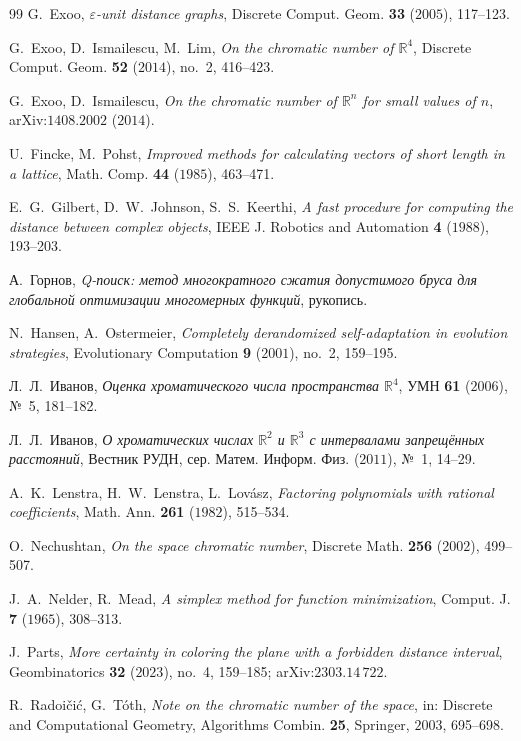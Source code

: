 \documentclass[11pt]{article}
\theoremstyle{definition}
\theoremstyle{remark}
\newcommand{\R}{\mathbb{R}}
\begin{document}
\begin{thebibliography}{99}
 G.~Exoo,
\emph{$\varepsilon$-unit distance graphs},
Discrete Comput. Geom. \textbf{33} ($2005$), 117--123.

 G.~Exoo, D.~Ismailescu, M.~Lim,
\emph{On the chromatic number of $\R^4$},
Discrete Comput. Geom. \textbf{52} ($2014$), no.~2, 416--423.

 G.~Exoo, D.~Ismailescu,
\emph{On the chromatic number of $\R^n$ for small values of $n$},
arXiv:$1408$.$2002$ ($2014$).

 U.~Fincke, M.~Pohst,
\emph{Improved methods for calculating vectors of short length in a lattice},
Math. Comp. \textbf{44} ($1985$), 463--471.

 E.~G.~Gilbert, D.~W.~Johnson, S.~S.~Keerthi,
\emph{A fast procedure for computing the distance between complex objects},
IEEE J. Robotics and Automation \textbf{4} ($1988$), 193--203.

 А.~Горнов,
\emph{Q-поиск: метод многократного сжатия допустимого бруса для глобальной
оптимизации многомерных функций}, рукопись.

 N.~Hansen, A.~Ostermeier,
\emph{Completely derandomized self-adaptation in evolution strategies},
Evolutionary Computation \textbf{9} ($2001$), no.~2, 159--195.

 Л.~Л.~Иванов,
\emph{Оценка хроматического числа пространства $\R^4$},
УМН \textbf{61} ($2006$), №~5, 181--182.

 Л.~Л.~Иванов,
\emph{О хроматических числах $\R^2$ и $\R^3$ с интервалами запрещённых
расстояний}, Вестник РУДН, сер. Матем. Информ. Физ. ($2011$), №~1, 14--29.

 A.~K.~Lenstra, H.~W.~Lenstra, L.~Lov\'asz,
\emph{Factoring polynomials with rational coefficients},
Math. Ann. \textbf{261} ($1982$), 515--534.

 O.~Nechushtan,
\emph{On the space chromatic number},
Discrete Math. \textbf{256} ($2002$), 499--507.

 J.~A.~Nelder, R.~Mead,
\emph{A simplex method for function minimization},
Comput. J. \textbf{7} ($1965$), 308--313.

 J.~Parts,
\emph{More certainty in coloring the plane with a forbidden distance
interval},
Geombinatorics \textbf{32} ($2023$), no.~4, 159--185; arXiv:$2303$.$14\,722$.

 R.~Radoi\v{c}i\'c, G.~T\'oth,
\emph{Note on the chromatic number of the space},
in: Discrete and Computational Geometry, Algorithms Combin. \textbf{25},
Springer, $2003$, 695--698.


\end{thebibliography}
\end{document}
